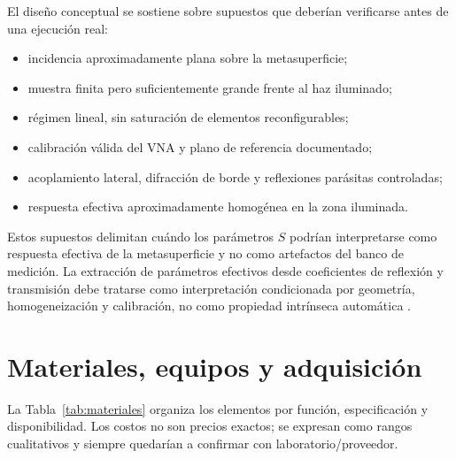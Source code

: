 \documentclass[12pt,a4paper]{article}
\begin{document}
El diseño conceptual se sostiene sobre supuestos que deberían verificarse antes de una ejecución real:
\begin{itemize}
  \item incidencia aproximadamente plana sobre la metasuperficie;
  \item muestra finita pero suficientemente grande frente al haz iluminado;
  \item régimen lineal, sin saturación de elementos reconfigurables;
  \item calibración válida del VNA y plano de referencia documentado;
  \item acoplamiento lateral, difracción de borde y reflexiones parásitas controladas;
  \item respuesta efectiva aproximadamente homogénea en la zona iluminada.
\end{itemize}
Estos supuestos delimitan cuándo los parámetros \(S\) podrían interpretarse como respuesta efectiva de la metasuperficie y no como artefactos del banco de medición. La extracción de parámetros efectivos desde coeficientes de reflexión y transmisión debe tratarse como interpretación condicionada por geometría, homogeneización y calibración, no como propiedad intrínseca automática \citep{smith2002retrieval,holloway2012overview}.

\section{Materiales, equipos y adquisición}

La Tabla~\ref{tab:materiales} organiza los elementos por función, especificación y disponibilidad. Los costos no son precios exactos; se expresan como rangos cualitativos y siempre quedarían a confirmar con laboratorio/proveedor.
\end{document}
